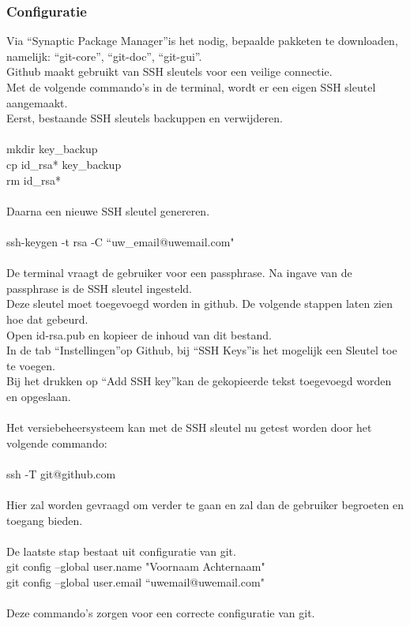\documentclass[12pt]{article}
\begin{document}
				\subsubsection{Configuratie}
					Via \textquotedblleft Synaptic Package Manager\textquotedblright is het nodig, bepaalde pakketen te downloaden, namelijk: \textquotedblleft git-core\textquotedblright, 								\textquotedblleft git-doc\textquotedblright, \textquotedblleft git-gui\textquotedblright.\\
					Github maakt gebruikt van SSH sleutels voor een veilige connectie.\\
					Met de volgende commando's in de terminal, wordt er een eigen SSH sleutel aangemaakt.\\
					Eerst, bestaande SSH sleutels backuppen en verwijderen.\\
					\\
					mkdir key\_backup\\
					cp id\_rsa* key\_backup\\
					rm id\_rsa*
					\\
					\\
					 Daarna een nieuwe SSH sleutel genereren.\\
					 \\
					 ssh-keygen -t rsa -C \textquotedblleft uw\_email@uwemail.com"\\
					 \\
					 De terminal vraagt de gebruiker voor een passphrase.
					 Na ingave van de passphrase is de SSH sleutel ingesteld.\\
					Deze sleutel moet toegevoegd worden in github. De volgende stappen laten zien hoe dat gebeurd.\\
					 Open id-rsa.pub en kopieer de inhoud van dit bestand.\\
					 In de tab \textquotedblleft Instellingen\textquotedblright op Github, bij \textquotedblleft SSH Keys\textquotedblright is het mogelijk een Sleutel toe te voegen.\\
					 Bij het drukken op \textquotedblleft Add SSH key\textquotedblright kan de gekopieerde tekst toegevoegd worden en opgeslaan.\\
					 \\
					 Het versiebeheersysteem kan met de SSH sleutel nu getest worden door het volgende commando:\\
					 \\
					 ssh -T git@github.com\\
					 \\
					 Hier zal worden gevraagd om verder te gaan en zal dan de gebruiker begroeten en toegang bieden.\\
					 \\
					 De laatste stap bestaat uit configuratie van git.\\
					 git config --global user.name "Voornaam Achternaam"\\
					 git config --global user.email \textquotedblleft uwemail@uwemail.com"\\
					 \\
					 Deze commando's zorgen voor een correcte configuratie van git.\\
					 \\
				\cite{Git}				
				
\end{document}
